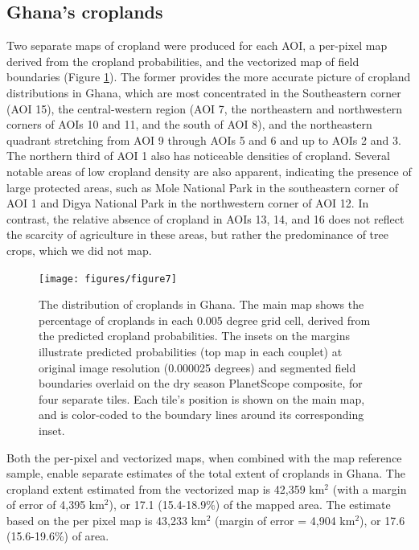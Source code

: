 \documentclass[11pt,a4paper]{article}
\begin{document}
\hypertarget{ghanas-croplands}{%
\subsection{Ghana's croplands}\label{ghanas-croplands}}

Two separate maps of cropland were produced for each AOI, a per-pixel
map derived from the cropland probabilities, and the vectorized map of
field boundaries (Figure \ref{fig:mainmap}). The former provides the
more accurate picture of cropland distributions in Ghana, which are most
concentrated in the Southeastern corner (AOI 15), the central-western
region (AOI 7, the northeastern and northwestern corners of AOIs 10 and
11, and the south of AOI 8), and the northeastern quadrant stretching
from AOI 9 through AOIs 5 and 6 and up to AOIs 2 and 3. The northern
third of AOI 1 also has noticeable densities of cropland. Several
notable areas of low cropland density are also apparent, indicating the
presence of large protected areas, such as Mole National Park in the
southeastern corner of AOI 1 and Digya National Park in the northwestern
corner of AOI 12. In contrast, the relative absence of cropland in AOIs
13, 14, and 16 does not reflect the scarcity of agriculture in these
areas, but rather the predominance of tree crops, which we did not map.

\begin{figure}

{\centering \texttt{[image: figures/figure7]} 

}

\caption{The distribution of croplands in Ghana. The main map shows the percentage of croplands in each 0.005 degree grid cell, derived from the predicted cropland probabilities. The insets  on the margins illustrate predicted probabilities (top map in each couplet) at original image resolution (0.000025 degrees) and segmented field boundaries overlaid on the dry season PlanetScope composite, for four separate tiles. Each tile's position is shown on the main map, and is color-coded to the boundary lines around its corresponding inset.}\label{fig:mainmap}
\end{figure}

Both the per-pixel and vectorized maps, when combined with the map
reference sample, enable separate estimates of the total extent of
croplands in Ghana. The cropland extent estimated from the vectorized
map is 42,359 km\(^2\) (with a margin of error of 4,395 km\(^2\)), or
17.1 (15.4-18.9\%) of the mapped area. The estimate based on the per
pixel map is 43,233 km\(^2\) (margin of error = 4,904 km\(^2\)), or 17.6
(15.6-19.6\%) of area.
\end{document}
